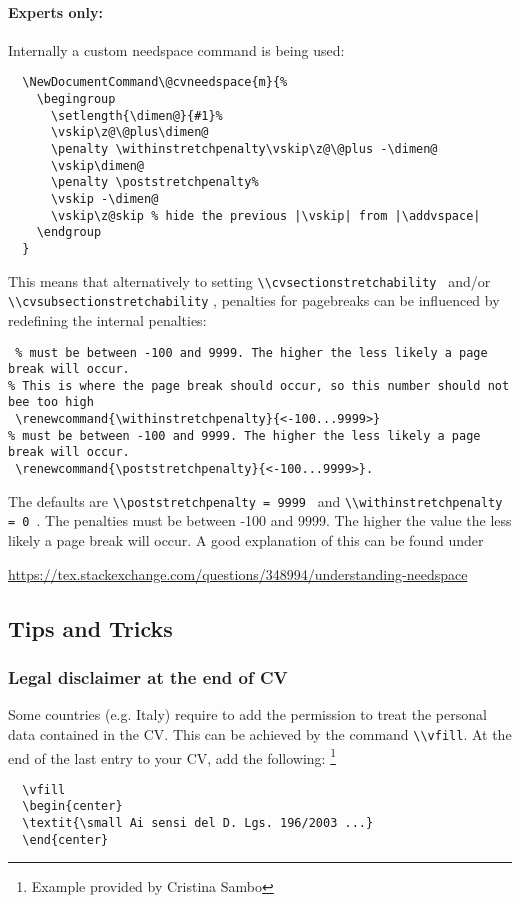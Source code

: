\documentclass[a4paper,11pt]{article}
\newcommand{\code}[1]{\lstinline!#1!}
\newcommand{\Code}[1]{\lstinline!#1!~} %
\begin{document}
\paragraph{Experts only:}
Internally a custom needspace command is being used: 

\begin{lstlisting}
  \NewDocumentCommand\@cvneedspace{m}{%
    \begingroup
      \setlength{\dimen@}{#1}%
      \vskip\z@\@plus\dimen@
      \penalty \withinstretchpenalty\vskip\z@\@plus -\dimen@
      \vskip\dimen@
      \penalty \poststretchpenalty%
      \vskip -\dimen@
      \vskip\z@skip % hide the previous |\vskip| from |\addvspace|
    \endgroup
  }
\end{lstlisting}
This means that alternatively to setting \Code{\\cvsectionstretchability} and/or \code{\\cvsubsectionstretchability} , penalties for pagebreaks can be influenced by redefining the internal penalties:
\begin{lstlisting}
 % must be between -100 and 9999. The higher the less likely a page break will occur.
% This is where the page break should occur, so this number should not bee too high
 \renewcommand{\withinstretchpenalty}{<-100...9999>}
% must be between -100 and 9999. The higher the less likely a page break will occur.
 \renewcommand{\poststretchpenalty}{<-100...9999>}.
\end{lstlisting}
The defaults are \Code{\\poststretchpenalty = 9999} and \Code{\\withinstretchpenalty = 0}. 
The penalties must be between -100 and 9999. The higher the value the less likely a page break will occur. A good explanation of this can be found under 
\begin{center}
  \url{https://tex.stackexchange.com/questions/348994/understanding-needspace}
\end{center}



\subsection{Tips and Tricks}
\subsubsection{Legal disclaimer at the end of CV}
Some countries (e.g. Italy) require to add the permission to treat the personal data contained in the CV. This can be achieved by the command \code{\\vfill}. At the end of the last entry to your 
CV, add the following:%
\footnote{Example provided by Cristina Sambo} %
\begin{lstlisting}
  \vfill
  \begin{center} 
  \textit{\small Ai sensi del D. Lgs. 196/2003 ...}
  \end{center}
\end{lstlisting}
\end{document}
